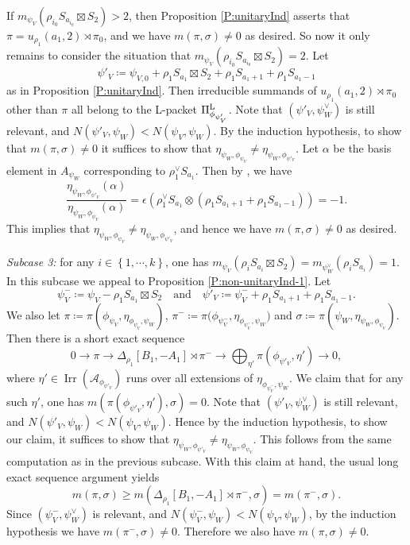 \documentclass[11pt,letterpaper]{amsart}
\theoremstyle{plain}
\numberwithin{theorem}{section}
\numberwithin{equation}{subsection}
\theoremstyle{remark}
\newcommand{\Irr}{\operatorname{Irr}}
\def\calA{\mathcal{A}}
\def\lra{\longrightarrow}
\def\LP{\Pi^{\rm L}} %
\begin{document}
If $m_{\psi_V}\left(\rho_{i_0} S_{a_{i_0}}\boxtimes S_2\right) > 2$, then Proposition \ref{P:unitaryInd} asserts that $\pi= u_{\rho_1}\left(a_1,2\right)\rtimes \pi_0$, and we have $m\left(\pi,\sigma\right)\neq 0$ as desired.
So now it only remains to consider the situation that $m_{\psi_V}\left(\rho_{i_0} S_{a_{i_0}}\boxtimes S_2\right) = 2$. Let
\[
    \psi'_V\coloneqq \psi_{V,0} + \rho_1 S_{a_1}\boxtimes S_2 + \rho_1 S_{a_1+1} + \rho_1 S_{a_1-1}
\]
as in Proposition \ref{P:unitaryInd}. Then irreducible summands of $u_{\rho_1}\left(a_1,2\right)\rtimes \pi_0$ other than $\pi$ all belong to the L-packet $\LP_{\phi_{\psi'_V}}$. Note that $\left(\psi'_V,\psi_W^\vee\right)$ is still relevant, and $N\left(\psi'_V,\psi_W\right)<N\left(\psi_V,\psi_W\right)$. By the induction hypothesis, to show that $m\left(\pi,\sigma\right)\neq 0$ it suffices to show that $\eta_{\psi_W,\phi_{\psi_V}}\neq \eta_{\psi_W,\phi_{\psi'_V}}$. Let \(\alpha\) be the basis element in \(A_{\psi_W}\) corresponding to \(\rho_1^\vee S_{a_1}\). Then by \cite[Lem. A.4]{MR3714507}, we have
\[
    \frac{\eta_{\psi_W,\phi_{\psi'_V}}(\alpha)}{\eta_{\psi_W,\phi_{\psi_V}}\left(\alpha\right)}=\epsilon\left(\rho_1^\vee S_{a_1}\otimes\left(\rho_1 S_{a_1+1}+\rho_1 S_{a_1-1}\right)\right)=-1.
\]
This implies that $\eta_{\psi_W,\phi_{\psi_V}}\neq \eta_{\psi_W,\phi_{\psi'_V}}$, and hence we have $m\left(\pi,\sigma\right)\neq 0$ as desired.

\vskip 5pt

\emph{Subcase 3:} for any $i\in\left\{1,\cdots,k\right\}$, one has $m_{\psi_V}\left(\rho_{i} S_{a_{i}}\boxtimes S_2\right) = m_{\psi_W^\vee}\left(\rho_{i} S_{a_{i}}\right)=1$. In this subcase we appeal to Proposition \ref{P:non-unitaryInd-1}. Let 
\[
    \psi_V^-\coloneqq \psi_V-\rho_1 S_{a_1}\boxtimes S_2 \quad \text{and}\quad \psi'_V \coloneqq \psi_V^- + \rho_1 S_{a_1+1} + \rho_1 S_{a_1-1}.
\]
We also let $\pi\coloneqq\pi\left(\phi_{\psi_V},\eta_{\phi_{\psi_V},\psi_W}\right)$, $\pi^-\coloneqq \pi\Big(\phi_{\psi_V^-},\eta_{\phi_{\psi_V^-},\psi_W}\Big)$ and $\sigma\coloneqq\pi\left(\psi_W,\eta_{\psi_W,\phi_{\psi_V}}\right)$. Then there is a short exact sequence
\[
    0\lra \pi \lra \Delta_{\rho_1}\left[B_1,-A_1\right]\rtimes \pi^- \lra \bigoplus_{\eta'} \pi\left(\phi_{\psi'_V},\eta'\right) \lra 0,
\]
where $\eta'\in\Irr\left(\calA_{\phi_{\psi'_V}}\right)$ runs over all extensions of $\eta_{\phi_{\psi_V^-},\psi_W}$. We claim that for any such $\eta'$, one has $m\left(\pi\left(\phi_{\psi'_V},\eta'\right),\sigma\right)=0$. Note that $\left(\psi'_V,\psi_W^\vee\right)$ is still relevant, and $N\left(\psi'_V,\psi_W\right)<N\left(\psi_V,\psi_W\right)$. Hence by the induction hypothesis, to show our claim, it suffices to show that $\eta_{\psi_W,\phi_{\psi'_V}}\neq \eta_{\psi_W,\phi_{\psi_V}}$. This follows from the same computation as in the previous subcase. With this claim at hand, the usual long exact sequence argument yields
\[
    m\left(\pi,\sigma\right)\geq m\left(\Delta_{\rho_1}\left[B_1,-A_1\right]\rtimes \pi^-,\sigma\right) = m\left(\pi^-,\sigma\right).
\]
Since $\left(\psi_V^-,\psi_W^\vee\right)$ is relevant, and $N\left(\psi_V^-,\psi_W\right)<N\left(\psi_V,\psi_W\right)$, by the induction hypothesis we have $m\left(\pi^-,\sigma\right)\neq 0$. Therefore we also have $m\left(\pi,\sigma\right)\neq 0$.
\end{document}
